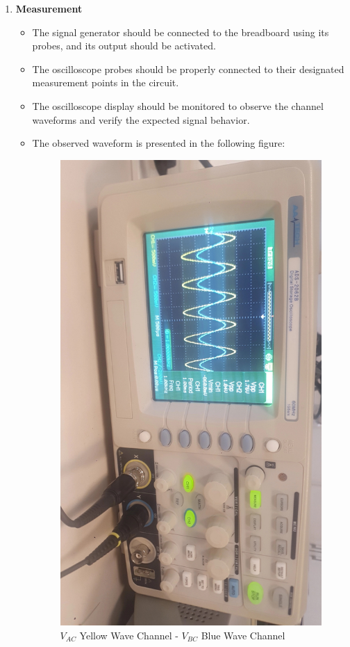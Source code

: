 \documentclass{article}
\begin{document}
\begin{enumerate}
  \item[] \textbf{Measurement}
  \begin{itemize}
    \item The signal generator should be connected to the breadboard using its probes, and its output should be activated.  
    \item The oscilloscope probes should be properly connected to their designated measurement points in the circuit.  
    \item The oscilloscope display should be monitored to observe the channel waveforms and verify the expected signal behavior.  
    \item The observed waveform is presented in the following figure:
    \begin{figure}[h]
      \centering
      \includegraphics[scale=0.15,angle=90]{images/Lab1_figure1}
      \caption{$V_{AC}$ Yellow Wave Channel - $V_{BC}$ Blue Wave Channel}
      \label{fig:waveform}
  \end{figure}
  \end{itemize}
  
\end{enumerate}
\end{document}
